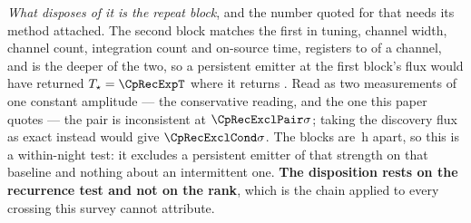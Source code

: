 \emph{What disposes of it is the repeat block}, and the number quoted for
that needs its method attached. The second block matches the first in tuning,
channel width, channel count, integration count and on-source time,
registers to \CpRecOffChan{} of a channel, and is the deeper of the two, so a
persistent emitter at the first block's flux would have returned
$T_\star=\CpRecExpT$ where it returns \CpRecT. Read as two measurements of
one constant amplitude --- the conservative reading, and the one this paper
quotes --- the pair is inconsistent at $\CpRecExclPair\sigma$; taking the
discovery flux as exact instead would give $\CpRecExclCond\sigma$. The blocks
are \CpSepH\,h apart, so this is a within-night test: it excludes a
persistent emitter of that strength on that baseline and nothing about an
intermittent one. \textbf{The disposition rests on the recurrence test and
not on the rank}, which is the chain applied to every crossing this survey
cannot attribute.

